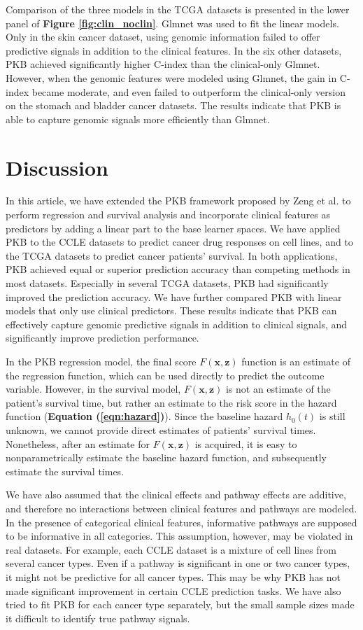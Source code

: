 \documentclass[a4paper,12pt]{article}
\newcommand{\bd}[1]{\mathbf{#1}}
\begin{document}
Comparison of the three models in the TCGA datasets is presented in the lower panel of \textbf{Figure \ref{fig:clin_noclin}}. Glmnet was used to fit the linear models. Only in the skin cancer dataset, using genomic information failed to offer predictive signals in addition to the clinical features. In the six other datasets, PKB achieved significantly higher C-index than the clinical-only Glmnet. However, when the genomic features were modeled using Glmnet, the gain in C-index became moderate, and even failed to outperform the clinical-only version on the stomach and bladder cancer datasets. The results indicate that PKB is able to capture genomic signals more efficiently than Glmnet.

\section{Discussion}
In this article, we have extended the PKB framework proposed by  Zeng et al.\cite{zeng2019pathway} to perform regression and survival analysis and incorporate clinical features as predictors by adding a linear part to the base learner spaces. We have applied PKB to the CCLE datasets to predict cancer drug responses on cell lines, and to the TCGA datasets to predict cancer patients' survival. In both applications, PKB achieved equal or superior prediction accuracy than competing methods in most datasets. Especially in several TCGA datasets, PKB had significantly improved the prediction accuracy. We have further compared PKB with linear models that only use clinical predictors. These results indicate that PKB can effectively capture genomic predictive signals in addition to clinical signals, and significantly improve prediction performance.

In the PKB regression model, the final score $F(\bd{x}, \bd{z})$ function is an estimate of the regression function, which can be used directly to predict the outcome variable. However, in the survival model, $F(\bd{x}, \bd{z})$ is not an estimate of the patient's survival time, but rather an estimate to the risk score in the hazard function (\textbf{Equation (\ref{eqn:hazard})}). Since the baseline hazard $h_0(t)$ is still unknown, we cannot provide direct estimates of patients' survival times. Nonetheless, after an estimate for $F(\bd{x}, \bd{z})$ is acquired, it is easy to nonparametrically estimate the baseline hazard function, and subsequently estimate the survival times.

We have also assumed that the clinical effects and pathway effects are additive, and therefore no interactions between clinical features and pathways are modeled. In the presence of categorical clinical features, informative pathways are supposed to be informative in all categories. This assumption, however, may be violated in real datasets. For example, each CCLE dataset is a mixture of cell lines from several cancer types. Even if a pathway is significant in one or two cancer types, it might not be predictive for all cancer types. \cite{sanchez2018oncogenic} This may be why PKB has not made significant improvement in certain CCLE prediction tasks. We have also tried to fit PKB for each cancer type separately, but the small sample sizes made it difficult to identify true pathway signals. 
\end{document}

